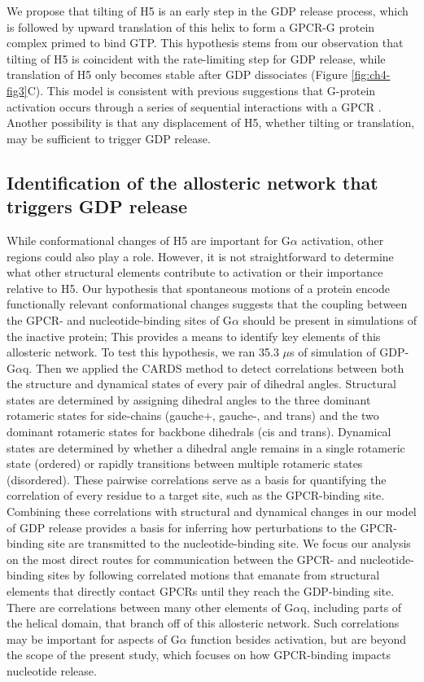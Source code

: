 \documentclass[../main.tex]{subfiles}
\begin{document}
        We propose that tilting of H5 is an early step in the GDP release process, which is followed by upward translation of this helix to form a GPCR-G protein complex primed to bind GTP. This hypothesis stems from our observation that tilting of H5 is coincident with the rate-limiting step for GDP release, while translation of H5 only becomes stable after GDP dissociates (Figure \ref{fig:ch4-fig3}C). This model is consistent with previous suggestions that G-protein activation occurs through a series of sequential interactions with a GPCR \cite{Oldham:2008cr,Rasmussen:2011kp}. Another possibility is that any displacement of H5, whether tilting or translation, may be sufficient to trigger GDP release.

    \subsection{Identification of the allosteric network that triggers GDP release}
        While conformational changes of H5 are important for G$\alpha$ activation, other regions could also play a role\cite{Hilger:2018en,Sun:2015gj}. However, it is not straightforward to determine what other structural elements contribute to activation or their importance relative to H5. Our hypothesis that spontaneous motions of a protein encode functionally relevant conformational changes suggests that the coupling between the GPCR- and nucleotide-binding sites of G$\alpha$ should be present in simulations of the inactive protein; This provides a means to identify key elements of this allosteric network. To test this hypothesis, we ran 35.3 $\mu$s of simulation of GDP-G$\alpha$q. Then we applied the CARDS method\cite{Singh:2017hh} to detect correlations between both the structure and dynamical states of every pair of dihedral angles. Structural states are determined by assigning dihedral angles to the three dominant rotameric states for side-chains (gauche+, gauche-, and trans) and the two dominant rotameric states for backbone dihedrals (cis and trans). Dynamical states are determined by whether a dihedral angle remains in a single rotameric state (ordered) or rapidly transitions between multiple rotameric states (disordered). These pairwise correlations serve as a basis for quantifying the correlation of every residue to a target site, such as the GPCR-binding site. Combining these correlations with structural and dynamical changes in our model of GDP release provides a basis for inferring how perturbations to the GPCR-binding site are transmitted to the nucleotide-binding site. We focus our analysis on the most direct routes for communication between the GPCR- and nucleotide-binding sites by following correlated motions that emanate from structural elements that directly contact GPCRs until they reach the GDP-binding site. There are correlations between many other elements of G$\alpha$q, including parts of the helical domain, that branch off of this allosteric network. Such correlations may be important for aspects of G$\alpha$ function besides activation, but are beyond the scope of the present study, which focuses on how GPCR-binding impacts nucleotide release.
\end{document}
